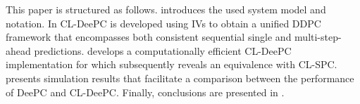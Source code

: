 This paper is structured as follows.  introduces the used system model and notation. In  \ac{CL-DeePC} is developed using \ac{IVs} to obtain a unified \ac{DDPC} framework that encompasses both consistent sequential single and multi-step-ahead predictions.  develops a computationally efficient \ac{CL-DeePC} implementation for which  subsequently reveals an equivalence with \ac{CL-SPC}. %
 presents simulation results that facilitate a comparison between the performance of \ac{DeePC} and \ac{CL-DeePC}. %
Finally, conclusions are presented in .

%
